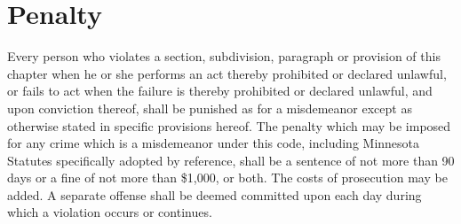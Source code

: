 \setcounter{section}{98}
\section{Penalty}
Every person who violates a section, subdivision, paragraph or provision of this chapter when he or she performs an act thereby prohibited or declared unlawful, or fails to act when the failure is thereby prohibited or declared unlawful, and upon conviction thereof, shall be punished as for a misdemeanor except as otherwise stated in specific provisions hereof. The penalty which may be imposed for any crime which is a misdemeanor under this code, including Minnesota Statutes specifically adopted by reference, shall be a sentence of not more than 90 days or a fine of not more than \$1,000, or both. The costs of prosecution may be added. A separate offense shall be deemed committed upon each day during which a violation occurs or continues.
